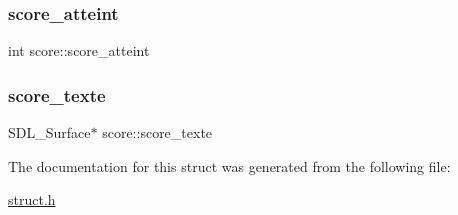 \mbox{\label{structscore_a86ee1f22a5bf4e92781f2b2165aa0859}} 
\subsubsection{\texorpdfstring{score\+\_\+atteint}{score\_atteint}}
{\footnotesize\ttfamily int score\+::score\+\_\+atteint}

\mbox{\label{structscore_aa5918332d1797da4bedaccfce5446b88}} 
\subsubsection{\texorpdfstring{score\+\_\+texte}{score\_texte}}
{\footnotesize\ttfamily S\+D\+L\+\_\+\+Surface$\ast$ score\+::score\+\_\+texte}



The documentation for this struct was generated from the following file\+:\begin{DoxyCompactItemize}
\item 
\hyperlink{struct_8h}{struct.\+h}\end{DoxyCompactItemize}
